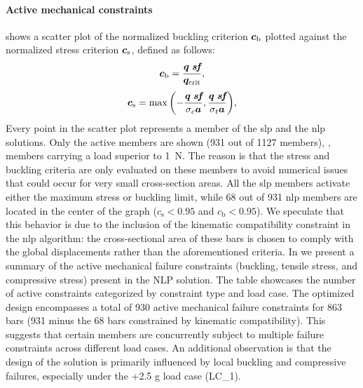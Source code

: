 \paragraph{Active mechanical constraints} \label{sec:07_amc}
 shows a scatter plot of the normalized buckling criterion $\bm{c}_\text{b}$ plotted against the normalized stress criterion $\bm{c}_\text{s}$, defined as follows:
\begin{equation}
    \bm{c}_\text{b}=\frac{\bm{q}\; \textit{\textbf{sf}}}{\bm{q}_{\text{crit}}},
\end{equation}
\begin{equation}
    \bm{c}_\text{s}=\max{\left(-\frac{\bm{q} \; \textit{\textbf{sf}}}{\sigma_c \bm{a}},\frac{\bm{q} \; \textit{\textbf{sf}}}{\sigma_t \bm{a}}\right)},
\end{equation}
Every point in the scatter plot represents a member of the \gls{slp} and the \gls{nlp} solutions. Only the active members are shown (931 out of 1127 members), \ie, members carrying a load superior to \qty{1}{N}. The reason is that the stress and buckling criteria are only evaluated on these members to avoid numerical issues that could occur for very small cross-section areas. All the \gls{slp} members activate either the maximum stress or buckling limit, while 68 out of 931 \gls{nlp} members are located in the center of the graph ($c_\text{s}<0.95$ and $c_\text{b}<0.95$). We speculate that this behavior is due to the inclusion of the kinematic compatibility constraint in the \gls{nlp} algorithm: the cross-sectional area of these bars is chosen to comply with the global displacements rather than the aforementioned criteria. In  we present a summary of the active mechanical failure constraints (buckling, tensile stress, and compressive stress) present in the NLP solution. The table showcases the number of active constraints categorized by constraint type and load case. The optimized design encompasses a total of 930 active mechanical failure constraints for 863 bars (931 minus the 68 bars constrained by kinematic compatibility). This suggests that certain members are concurrently subject to multiple failure constraints across different load cases. An additional observation is that the design of the solution is primarily influenced by local buckling and compressive failures, especially under the +2.5 g load case (LC\_1).

